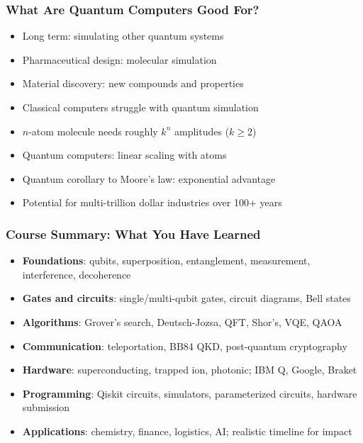\begin{frame}[fragile]\frametitle{What Are Quantum Computers Good For?}
\begin{itemize}
\item Long term: simulating other quantum systems
\item Pharmaceutical design: molecular simulation
\item Material discovery: new compounds and properties
\item Classical computers struggle with quantum simulation
\item $n$-atom molecule needs roughly $k^n$ amplitudes ($k \geq 2$)
\item Quantum computers: linear scaling with atoms
\item Quantum corollary to Moore's law: exponential advantage
\item Potential for multi-trillion dollar industries over 100+ years
\end{itemize}
\end{frame}


\begin{frame}[fragile]\frametitle{Course Summary: What You Have Learned}
\begin{itemize}
\item \textbf{Foundations}: qubits, superposition, entanglement, measurement, interference, decoherence
\item \textbf{Gates and circuits}: single/multi-qubit gates, circuit diagrams, Bell states
\item \textbf{Algorithms}: Grover's search, Deutsch-Jozsa, QFT, Shor's, VQE, QAOA
\item \textbf{Communication}: teleportation, BB84 QKD, post-quantum cryptography
\item \textbf{Hardware}: superconducting, trapped ion, photonic; IBM Q, Google, Braket
\item \textbf{Programming}: Qiskit circuits, simulators, parameterized circuits, hardware submission
\item \textbf{Applications}: chemistry, finance, logistics, AI; realistic timeline for impact
\end{itemize}
\end{frame}

